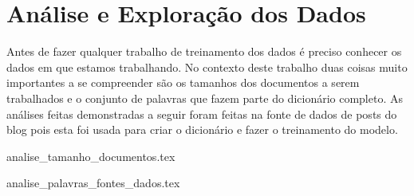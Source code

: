 \section{Análise e Exploração dos Dados}

Antes de fazer qualquer trabalho de treinamento dos dados é preciso conhecer os dados em que estamos trabalhando. No contexto deste trabalho
duas coisas muito importantes a se compreender são os tamanhos dos documentos a serem trabalhados e o conjunto de palavras que fazem
parte do dicionário completo. As análises feitas demonstradas a seguir foram feitas na fonte de dados de posts do blog pois esta foi 
usada para criar o dicionário e fazer o treinamento do modelo.

{analise_tamanho_documentos.tex}

{analise_palavras_fontes_dados.tex}